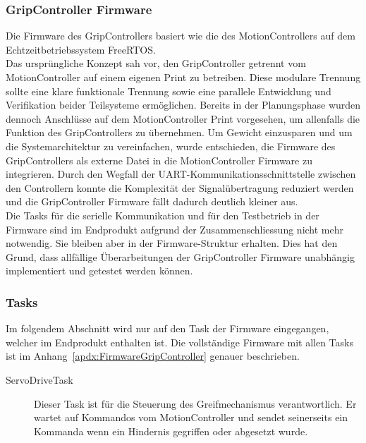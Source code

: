 \documentclass[main.tex]{subfiles} %
\begin{document}

\subsubsection{GripController Firmware}

Die Firmware des GripControllers basiert wie die des MotionControllers auf dem Echtzeitbetriebssystem FreeRTOS.\\
Das ursprüngliche Konzept sah vor, den GripController getrennt vom MotionController auf einem
eigenen Print zu betreiben. Diese modulare Trennung sollte eine klare funktionale Trennung
sowie eine parallele Entwicklung und Verifikation beider Teilsysteme ermöglichen. Bereits in der Planungsphase
wurden dennoch Anschlüsse auf dem MotionController Print vorgesehen, um allenfalls die Funktion des
GripControllers zu übernehmen. Um Gewicht einzusparen und um die Systemarchitektur zu vereinfachen,
wurde entschieden, die Firmware des GripControllers als externe Datei in die MotionController Firmware
zu integrieren. Durch den Wegfall der UART-Kommunikationsschnittstelle zwischen den Controllern
konnte die Komplexität der Signalübertragung reduziert werden und die GripController Firmware fällt dadurch
deutlich kleiner aus.\\

Die Tasks für die serielle Kommunikation und für den Testbetrieb in der Firmware sind im Endprodukt aufgrund
der Zusammenschliessung nicht mehr notwendig. Sie bleiben aber 
in der Firmware-Struktur erhalten. Dies hat den Grund, dass allfällige Überarbeitungen der GripController
Firmware unabhängig implementiert und getestet werden können.\\

\subsubsection*{Tasks}
Im folgendem Abschnitt wird nur auf den Task der Firmware eingegangen, welcher im Endprodukt enthalten ist.
Die vollständige Firmware mit allen Tasks ist im Anhang~\ref{apdx:FirmwareGripController} genauer beschrieben.

\begin{description}
    \item[ServoDriveTask] Dieser Task ist für die Steuerung des Greifmechanismus verantwortlich. Er wartet auf
    Kommandos vom MotionController und sendet seinerseits ein Kommanda wenn ein Hindernis gegriffen oder abgesetzt
    wurde.
\end{description}
\end{document}
